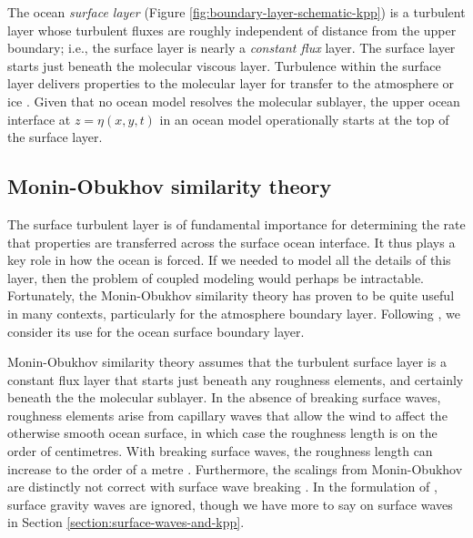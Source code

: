 The ocean {\it surface layer} (Figure
\ref{fig:boundary-layer-schematic-kpp}) is a turbulent layer whose
turbulent fluxes are roughly independent of distance from the upper
boundary; i.e., the surface layer is nearly a {\it constant flux}
layer.  The surface layer starts just beneath the molecular viscous
layer.  Turbulence within the surface layer delivers properties to the
molecular layer for transfer to the atmosphere or ice
\citep{Fairall_etal1996}.  Given that no ocean model resolves the
molecular sublayer, the upper ocean interface at $z=\eta(x,y,t)$ in an
ocean model operationally starts at the top of the surface layer.


\subsection{Monin-Obukhov similarity theory}
\label{subsection:m-o-similarity-theory}

The surface turbulent layer is of fundamental importance for
determining the rate that properties are transferred across the
surface ocean interface.  It thus plays a key role in how the ocean is
forced.  If we needed to model all the details of this layer, then the
problem of coupled modeling would perhaps be intractable.
Fortunately, the Monin-Obukhov similarity theory has proven to be
quite useful in many contexts, particularly for the atmosphere
boundary layer.  Following \cite{LargeKPP}, we consider its use for
the ocean surface boundary layer.

Monin-Obukhov similarity theory assumes that the turbulent surface
layer is a constant flux layer that starts just beneath any roughness
elements, and certainly beneath the the molecular sublayer.  In the
absence of breaking surface waves, roughness elements arise from
capillary waves that allow the wind to affect the otherwise smooth
ocean surface, in which case the roughness length is on the order of
centimetres.  With breaking surface waves, the roughness length can
increase to the order of a metre \citep[e.g., see concluding section
to][]{Craig_Banner_1994}.  Furthermore, the scalings from
Monin-Obukhov are distinctly not correct with surface wave breaking
\citep[e.g.,][]{Craig_Banner_1994,Terray_etal1996}.  In the
formulation of \cite{LargeKPP}, surface gravity waves are ignored,
though we have more to say on surface waves in Section
\ref{section:surface-waves-and-kpp}.

